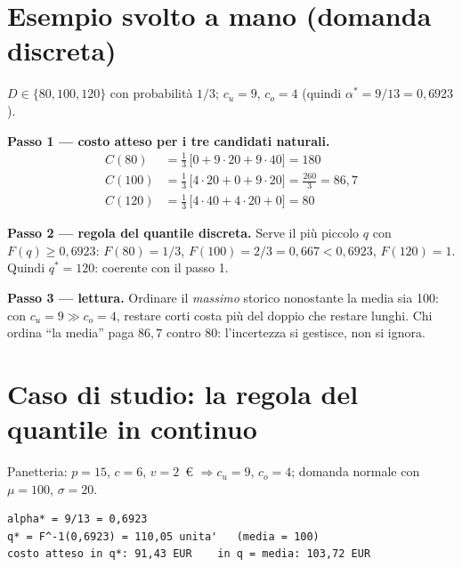 \section{Esempio svolto a mano (domanda discreta)}

\begin{esempio}
$D \in \{80, 100, 120\}$ con probabilità $1/3$; $c_u = 9$, $c_o = 4$
(quindi $\alpha^* = 9/13 = 0{,}6923$).

\textbf{Passo 1 — costo atteso per i tre candidati naturali.}
\begin{align*}
C(80) &= \tfrac13\,\bigl[0 + 9 \cdot 20 + 9 \cdot 40\bigr] = 180 \\
C(100) &= \tfrac13\,\bigl[4 \cdot 20 + 0 + 9 \cdot 20\bigr] = \tfrac{260}{3} = 86{,}7 \\
C(120) &= \tfrac13\,\bigl[4 \cdot 40 + 4 \cdot 20 + 0\bigr] = 80
\end{align*}

\textbf{Passo 2 — regola del quantile discreta.} Serve il più piccolo $q$ con
$F(q) \ge 0{,}6923$: $F(80) = 1/3$, $F(100) = 2/3 = 0{,}667 < 0{,}6923$,
$F(120) = 1$. Quindi $q^* = 120$: coerente con il passo 1.

\textbf{Passo 3 — lettura.} Ordinare il \emph{massimo} storico nonostante la media
sia 100: con $c_u = 9 \gg c_o = 4$, restare corti costa più del doppio che restare
lunghi. Chi ordina ``la media'' paga $86{,}7$ contro $80$: l'incertezza si gestisce,
non si ignora.
\end{esempio}

\section{Caso di studio: la regola del quantile in continuo}

Panetteria: $p = 15$, $c = 6$, $v = 2$~\euro{} $\Rightarrow c_u = 9$, $c_o = 4$;
domanda normale con $\mu = 100$, $\sigma = 20$.

\begin{lstlisting}[style=output]
alpha* = 9/13 = 0,6923
q* = F^-1(0,6923) = 110,05 unita'   (media = 100)
costo atteso in q*: 91,43 EUR    in q = media: 103,72 EUR
\end{lstlisting}


